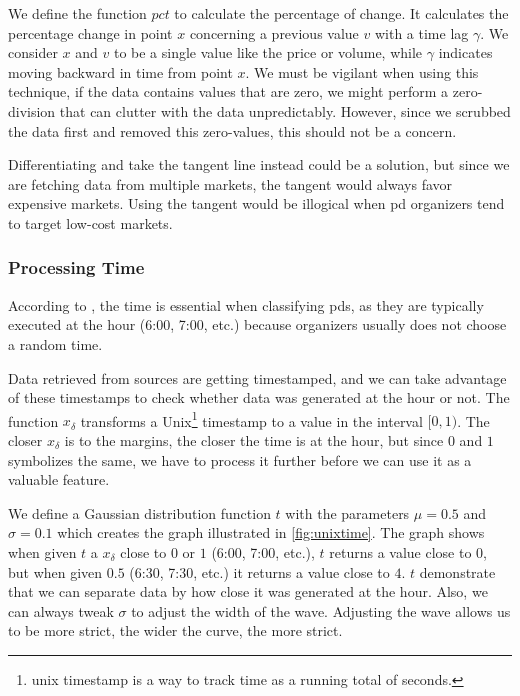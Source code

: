 We define the function $pct$ to calculate the percentage of change. It calculates the percentage change in point $x$ concerning a previous value $v$ with a time lag $\gamma$. We consider $x$ and $v$ to be a single value like the price or volume, while $\gamma$ indicates moving backward in time from point $x$. We must be vigilant when using this technique, if the data contains values that are zero, we might perform a zero-division that can clutter with the data unpredictably. However, since we scrubbed the data first and removed this zero-values, this should not be a concern.



Differentiating and take the tangent line instead could be a solution, but since we are fetching data from multiple markets, the tangent would always favor expensive markets. Using the tangent would be illogical when \ac{pd} organizers tend to target low-cost markets.

\subsubsection{Processing Time}
According to \cite{P&D_anatomy}, the time is essential when classifying \acp{pd}, as they are typically executed at the hour (6:00, 7:00, etc.) because organizers usually does not choose a random time.



Data retrieved from sources are getting timestamped, and we can take advantage of these timestamps to check whether data was generated at the hour or not. The function $x_\delta$ transforms a Unix\footnote{unix timestamp is a way to track time as a running total of seconds.} timestamp to a value in the interval $[0, 1)$. The closer $x_\delta$ is to the margins, the closer the time is at the hour, but since $0$ and $1$ symbolizes the same, we have to process it further before we can use it as a valuable feature.

We define a Gaussian distribution function $t$ with the parameters $\mu=0.5$ and $\sigma=0.1$ which creates the graph illustrated in \autoref{fig:unixtime}. The graph shows when given $t$ a $x_\delta$ close to $0$ or $1$ (6:00, 7:00, etc.), $t$ returns a value close to $0$, but when given $0.5$ (6:30, 7:30, etc.) it returns a value close to $4$. $t$ demonstrate that we can separate data by how close it was generated at the hour. Also, we can always tweak $\sigma$ to adjust the width of the wave. Adjusting the wave allows us to be more strict, the wider the curve, the more strict.

